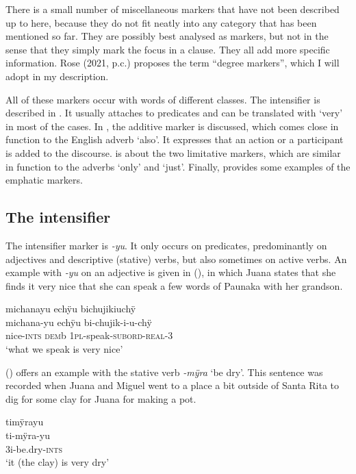 There is a small number of miscellaneous markers that have not been described up to here, because they do not fit neatly into any category that has been mentioned so far. They are possibly best analysed as  markers, but not in the sense that they simply mark the focus in a clause. They all add more specific information. Rose (2021, p.c.) proposes the term “degree markers”, which I will adopt in my description.

All of these markers occur with words of different classes. The intensifier is described in . It usually attaches to predicates and can be translated with ‘very’ in most of the cases. In , the additive marker is discussed, which comes close in function to the English adverb ‘also’. It expresses that an action or a participant is added to the discourse.  is about the two limitative markers, which are similar in function to the adverbs ‘only’ and ‘just’. Finally,  provides some examples of the emphatic markers.

\subsection{The intensifier}\label{sec:Intensifier}

The intensifier marker is \textit{-yu}. It only occurs on predicates, predominantly on adjectives and descriptive (stative) verbs, but also sometimes on active verbs. An example with \textit{-yu} on an adjective is given in (), in which Juana states that she finds it very nice that she can speak a few words of Paunaka with her grandson.

\ea\label{ex:yu-ADJ}
\begingl
\glpreamble michanayu echÿu bichujikiuchÿ \\
\gla michana-yu echÿu bi-chujik-i-u-chÿ \\
\glb nice-\textsc{ints} \textsc{dem}b 1\textsc{pl}-speak-\textsc{subord}-\textsc{real}-3\\
\glft ‘what we speak is very nice’
\endgl
\trailingcitation{[jxx-x110916.31]}
\xe

() offers an example with the stative verb \textit{-mÿra} ‘be dry’. This sentence was recorded when Juana and Miguel went to a place a bit outside of Santa Rita to dig for some clay for Juana for making a pot.

\ea\label{ex:yu-STAT}
\begingl
\glpreamble timÿrayu\\
\gla ti-mÿra-yu\\
\glb 3i-be.dry-\textsc{ints}\\
\glft ‘it (the clay) is very dry’
\endgl
\trailingcitation{[jmx-d110918ls-1.032]}
\xe


